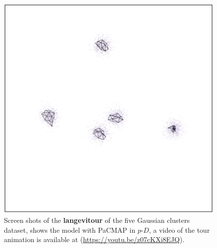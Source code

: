 \documentclass[
  12pt]{article}
\newcommand\pD{$p\text{-}D$}
\begin{document}
\begin{figure}[H]
%
\begin{minipage}{0.33\linewidth}
\includegraphics{figures/five_gau_clusters/sc_pacmap_3.png}\end{minipage}%

\caption{\label{fig-gau4_sc}Screen shots of the \textbf{langevitour} of
the five Gaussian clusters dataset, shows the model with PaCMAP in
\pD{}, a video of the tour animation is available at
(\url{https://youtu.be/z07cKXi8EJQ}).}

\end{figure}%
\end{document}
